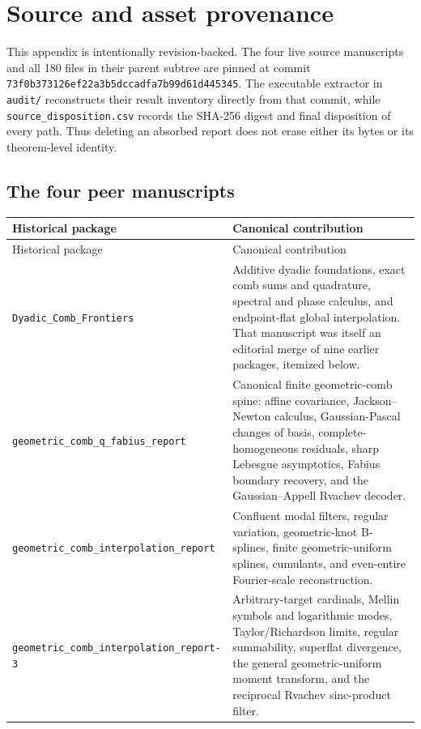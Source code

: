 \section{Source and asset provenance}
\label{app:provenance}

This appendix is intentionally revision-backed.  The four live source
manuscripts and all 180 files in their parent subtree are pinned at commit
\texttt{73f0b373126ef22a3b5dccadfa7b99d61d445345}.  The executable extractor in
\nolinkurl{audit/} reconstructs their result inventory directly from that
commit, while \nolinkurl{source_disposition.csv} records the SHA-256 digest and
final disposition of every path.  Thus deleting an absorbed report does not
erase either its bytes or its theorem-level identity.

\subsection{The four peer manuscripts}

\begin{longtable}{@{}p{}p{}@{}}
\toprule
Historical package & Canonical contribution \\
\midrule
\endfirsthead
\toprule
Historical package & Canonical contribution \\
\midrule
\endhead
\nolinkurl{Dyadic_Comb_Frontiers} & Additive dyadic foundations, exact comb
sums and quadrature, spectral and phase calculus, and endpoint-flat global
interpolation.  That manuscript was itself an editorial merge of nine earlier
packages, itemized below. \\
\addlinespace
\nolinkurl{geometric_comb_q_fabius_report} & Canonical finite geometric-comb
spine: affine covariance, Jackson--Newton calculus, Gaussian-Pascal changes of
basis, complete-homogeneous residuals, sharp Lebesgue asymptotics, Fabius
boundary recovery, and the Gaussian--Appell Rvachev decoder. \\
\addlinespace
\nolinkurl{geometric_comb_interpolation_report} & Confluent modal filters,
regular variation, geometric-knot B-splines, finite geometric-uniform splines,
cumulants, and even-entire Fourier-scale reconstruction. \\
\addlinespace
\nolinkurl{geometric_comb_interpolation_report-3} & Arbitrary-target
cardinals, Mellin symbols and logarithmic modes, Taylor/Richardson limits,
regular summability, superflat divergence, the general geometric-uniform
moment transform, and the reciprocal Rvachev sinc-product filter. \\
\bottomrule
\end{longtable}

